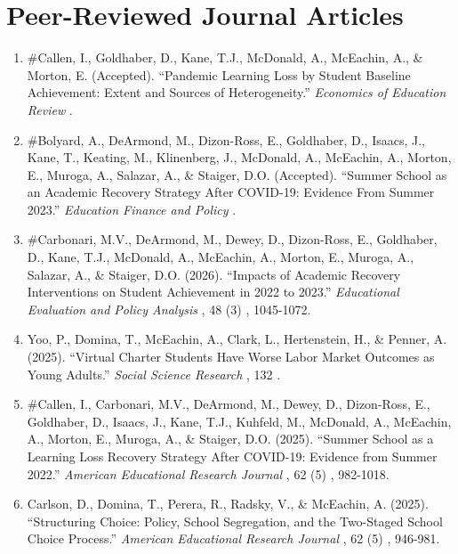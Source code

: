 \documentclass[11pt, letterpaper]{article}
\newcommand*{\revtotal}{0}
\newcommand*{\revarabic}[1]{\number\numexpr\revtotal + 1 - \value{#1}\relax}
\begin{document}
\section{Peer-Reviewed Journal Articles}
\renewcommand*{\revtotal}{38}
\begin{enumerate}[leftmargin=2em, label=\revarabic*.]
  \item \#Callen, I., Goldhaber, D., Kane, T.J., McDonald, A., McEachin, A., \& Morton, E. (Accepted).
  ``Pandemic Learning Loss by Student Baseline Achievement: Extent and Sources of Heterogeneity.''
  \textit{Economics of Education Review}%
%
%
.

  \item \#Bolyard, A., DeArmond, M., Dizon-Ross, E., Goldhaber, D., Isaacs, J., Kane, T., Keating, M., Klinenberg, J., McDonald, A., McEachin, A., Morton, E., Muroga, A., Salazar, A., \& Staiger, D.O. (Accepted).
  ``Summer School as an Academic Recovery Strategy After COVID-19: Evidence From Summer 2023.''
  \textit{Education Finance and Policy}%
%
%
.

  \item \#Carbonari, M.V., DeArmond, M., Dewey, D., Dizon-Ross, E., Goldhaber, D., Kane, T.J., McDonald, A., McEachin, A., Morton, E., Muroga, A., Salazar, A., \& Staiger, D.O. (2026).
  ``Impacts of Academic Recovery Interventions on Student Achievement in 2022 to 2023.''
  \textit{Educational Evaluation and Policy Analysis}%
, 48%
(3)%
, 1045-1072.

  \item Yoo, P., Domina, T., McEachin, A., Clark, L., Hertenstein, H., \& Penner, A. (2025).
  ``Virtual Charter Students Have Worse Labor Market Outcomes as Young Adults.''
  \textit{Social Science Research}%
, 132%
%
.

  \item \#Callen, I., Carbonari, M.V., DeArmond, M., Dewey, D., Dizon-Ross, E., Goldhaber, D., Isaacs, J., Kane, T.J., Kuhfeld, M., McDonald, A., McEachin, A., Morton, E., Muroga, A., \& Staiger, D.O. (2025).
  ``Summer School as a Learning Loss Recovery Strategy After COVID-19: Evidence from Summer 2022.''
  \textit{American Educational Research Journal}%
, 62%
(5)%
, 982-1018.

  \item Carlson, D., Domina, T., Perera, R., Radsky, V., \& McEachin, A. (2025).
  ``Structuring Choice: Policy, School Segregation, and the Two-Staged School Choice Process.''
  \textit{American Educational Research Journal}%
, 62%
(5)%
, 946-981.


\end{enumerate}
\end{document}
